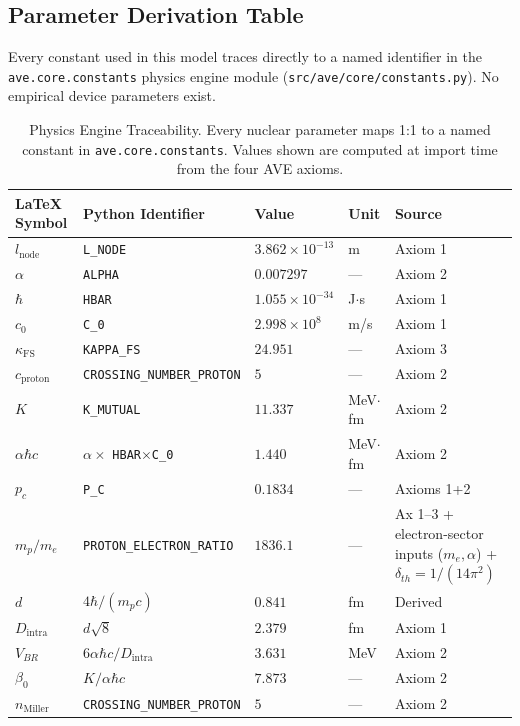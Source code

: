 \subsection{Parameter Derivation Table}

Every constant used in this model traces directly to a named identifier in the \texttt{ave.core.constants} physics engine module (\texttt{src/ave/core/constants.py}). No empirical device parameters exist.

\begin{table}[htbp]
\centering
\caption{Physics Engine Traceability. Every nuclear parameter maps 1:1 to a named constant in \texttt{ave.core.constants}. Values shown are computed at import time from the four AVE axioms.}
\label{tab:engine_traceability}
\begin{tabularx}{\textwidth}{@{}l l l l X@{}}
\hline
\textbf{LaTeX Symbol} & \textbf{Python Identifier} & \textbf{Value} & \textbf{Unit} & \textbf{Source} \\
\hline
$l_\text{node}$ & \texttt{L\_NODE} & $3.862\times10^{-13}$ & m & Axiom 1 \\
$\alpha$ & \texttt{ALPHA} & $0.007297$ & --- & Axiom 2 \\
$\hbar$ & \texttt{HBAR} & $1.055\times10^{-34}$ & J$\cdot$s & Axiom 1 \\
$c_0$ & \texttt{C\_0} & $2.998\times10^{8}$ & m/s & Axiom 1 \\
$\kappa_\text{FS}$ & \texttt{KAPPA\_FS} & $24.951$ & --- & Axiom 3 \\
$c_\text{proton}$ & \texttt{CROSSING\_NUMBER\_PROTON} & $5$ & --- & Axiom 2 \\
$K$ & \texttt{K\_MUTUAL} & $11.337$ & MeV$\cdot$fm & Axiom 2 \\
$\alpha\hbar c$ & $\alpha \times$ \texttt{HBAR}$\times$\texttt{C\_0} & $1.440$ & MeV$\cdot$fm & Axiom 2 \\
$p_c$ & \texttt{P\_C} & $0.1834$ & --- & Axioms 1+2 \\
$m_p/m_e$ & \texttt{PROTON\_ELECTRON\_RATIO} & $1836.1$ & --- & Ax 1--3 + electron-sector inputs ($m_e,\alpha$) + $\delta_{th}=1/(14\pi^2)$ \\
$d$ & $4\hbar/(m_p c)$ & $0.841$ & fm & Derived \\
$D_\text{intra}$ & $d\sqrt{8}$ & $2.379$ & fm & Axiom 1 \\
$V_{BR}$ & $6\alpha\hbar c / D_\text{intra}$ & $3.631$ & MeV & Axiom 2 \\
$\beta_0$ & $K/\alpha\hbar c$ & $7.873$ & --- & Axiom 2 \\
$n_\text{Miller}$ & \texttt{CROSSING\_NUMBER\_PROTON} & $5$ & --- & Axiom 2 \\
\hline
\end{tabularx}
\end{table}

